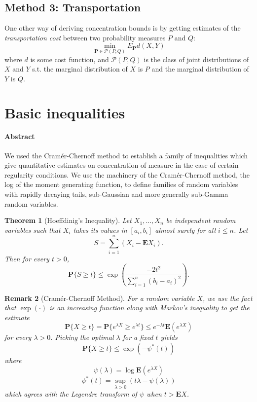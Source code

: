 \documentclass{amsproc}
\newtheorem{theorem}{Theorem}
\newtheorem{remark}[theorem]{Remark}
\begin{document}
	\subsection*{Method 3: Transportation}

	One other way of deriving concentration bounds is by getting estimates of the \textit{transportation cost} between two probability measures $P$ and $Q$:
	\[
		\min_{\mathbf{P}\in\mathcal{P}(P,Q)}E_\mathbf{P}d(X,Y)
	\]
	where $d$ is some cost function, and $\mathcal{P}(P,Q)$ is the class of joint distributions of $X$ and $Y$ s.t. the marginal distribution of $X$ is $P$ and the marginal distribution of $Y$ is $Q$.


\section{Basic inequalities}
\label{sec:basic_inequalites}
\paragraph{\textbf{Abstract}}
We used the Cram\'{e}r-Chernoff method to establish a family of inequalities which give quantitative estimates on concentration of measure in the case of certain regularity conditions. We use the machinery of the Cram\'{e}r-Chernoff method, the log of the moment generating function, to define families of random variables with rapidly decaying tails, sub-Gaussian and more generally sub-Gamma random variables.

\begin{theorem}[Hoeffdinig's Inequality]
\label{thm:hoeffding}
Let $X_1, \dots, X_n$ be independent random variables such that $X_i$ takes its values in $[a_i, b_i]$ almost surely for all $i \leq n$. Let
\[S = \sum_{i=1}^n (X_i - \mathbf{E}X_i).\]
Then for every $t > 0$,
\[\mathbf{P} \{S \geq t \} \leq  \exp \left( \frac{-2t^2}{\sum_{i=1}^n (b_i-a_i)^2} \right).\]
\end{theorem}

\begin{remark}[Cram\'{e}r-Chernoff Method]
\label{rmk:reference-name}
For a random variable $X$, we use the fact that $\exp(\cdot)$ is an increasing function along with Markov's inequality to get the estimate
\[\mathbf{P} \{X \geq t \} = \mathbf{P} \{e^{\lambda X} \geq e^{\lambda t} \} \leq e^{-\lambda t} \mathbf{E}\left( e^{\lambda X} \right)\]
for every $\lambda > 0$.
Picking the optimal $\lambda$ for a fixed $t$ yields
\[\mathbf{P} \{X \geq t \} \leq \exp \left( -\psi^*(t) \right) \]
where 
\[\psi(\lambda) = \log \mathbf{E}\left( e^{\lambda X} \right)\]
\[\psi^*(t) = \sup_{\lambda > 0} \left( t \lambda - \psi(\lambda) \right) \]
which agrees with the Legendre transform of $\psi$ when $t > \mathbf{E}X$.
\end{remark}
\end{document}
